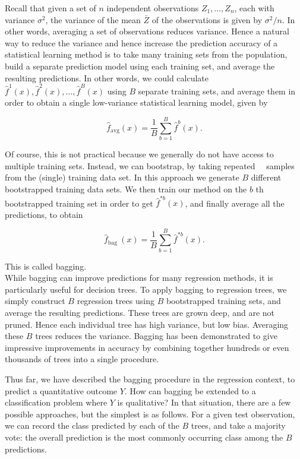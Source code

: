 \documentclass[10pt]{article}
\begin{document}
Recall that given a set of $n$ independent observations $Z_{1}, \ldots, Z_{n}$, each with variance $\sigma^{2}$, the variance of the mean $\bar{Z}$ of the observations is given by $\sigma^{2} / n$. In other words, averaging a set of observations reduces variance. Hence a natural way to reduce the variance and hence increase the prediction accuracy of a statistical learning method is to take many training sets from the population, build a separate prediction model using each training set, and average the resulting predictions. In other words, we could calculate $\hat{f}^{1}(x), \hat{f}^{2}(x), \ldots, \hat{f}^{B}(x)$ using $B$ separate training sets, and average them in order to obtain a single low-variance statistical learning model, given by

$$
\hat{f}_{\mathrm{avg}}(x)=\frac{1}{B} \sum_{b=1}^{B} \hat{f}^{b}(x) .
$$

Of course, this is not practical because we generally do not have access to multiple training sets. Instead, we can bootstrap, by taking repeated\
\
samples from the (single) training data set. In this approach we generate $B$ different bootstrapped training data sets. We then train our method on the $b$ th bootstrapped training set in order to get $\hat{f}^{* b}(x)$, and finally average all the predictions, to obtain

$$
\hat{f}_{\text {bag }}(x)=\frac{1}{B} \sum_{b=1}^{B} \hat{f}^{* b}(x) .
$$

This is called bagging.\\
While bagging can improve predictions for many regression methods, it is particularly useful for decision trees. To apply bagging to regression trees, we simply construct $B$ regression trees using $B$ bootstrapped training sets, and average the resulting predictions. These trees are grown deep, and are not pruned. Hence each individual tree has high variance, but low bias. Averaging these $B$ trees reduces the variance. Bagging has been demonstrated to give impressive improvements in accuracy by combining together hundreds or even thousands of trees into a single procedure.

Thus far, we have described the bagging procedure in the regression context, to predict a quantitative outcome $Y$. How can bagging be extended to a classification problem where $Y$ is qualitative? In that situation, there are a few possible approaches, but the simplest is as follows. For a given test observation, we can record the class predicted by each of the $B$ trees, and take a majority vote: the overall prediction is the most commonly occurring class among the $B$ predictions.
\end{document}
